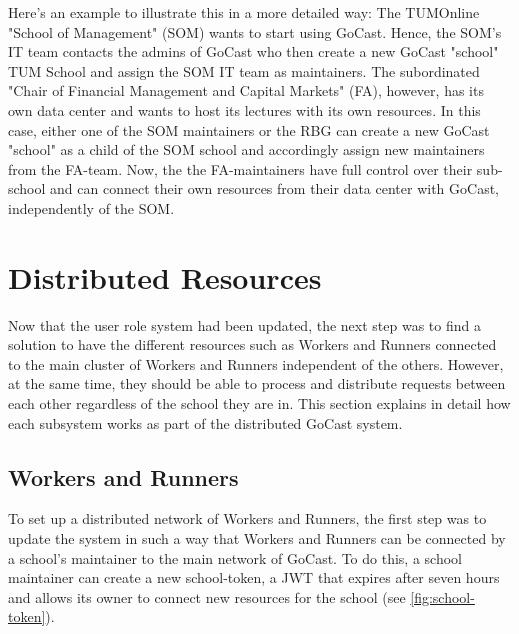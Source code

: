 Here's an example to illustrate this in a more detailed way:
The TUMOnline "School of Management" (SOM) wants to start using GoCast. Hence, the SOM's IT team contacts the admins of GoCast who then create a new GoCast "school" TUM School and assign the SOM IT team as maintainers.
The subordinated "Chair of Financial Management and Capital Markets" (FA), however, has its own data center and wants to host its lectures with its own resources. In this case, either one of the SOM maintainers or the RBG can create a new GoCast "school" as a child of the SOM school and accordingly assign new maintainers from the FA-team. Now, the the FA-maintainers have full control over their sub-school and can connect their own resources from their data center with GoCast, independently of the SOM.











\section{Distributed Resources}

Now that the user role system had been updated, the next step was to find a solution to have the different resources such as Workers and Runners connected to the main cluster of Workers and Runners independent of the others. However, at the same time, they should be able to process and distribute requests between each other regardless of the school they are in. This section explains in detail how each subsystem works as part of the distributed GoCast system. 

\subsection{Workers and Runners}
To set up a distributed network of Workers and Runners, the first step was to update the system in such a way that Workers and Runners can be connected by a school's maintainer to the main network of GoCast. To do this, a school maintainer can create a new school-token, a \ac{JWT} that expires after seven hours and allows its owner to connect new resources for the school (see \autoref{fig:school-token}).

